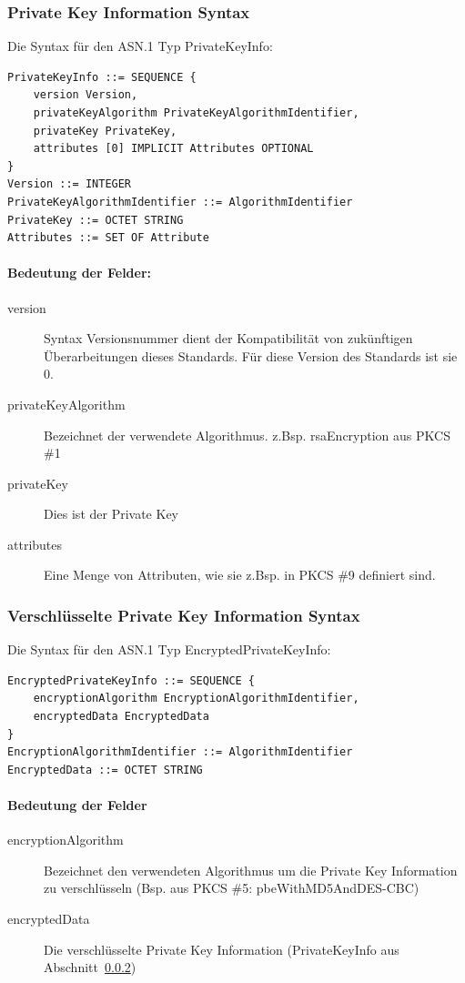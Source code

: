 \documentclass[10pt,a4paper]{article}
\begin{document}
\subsubsection{Private Key Information Syntax}
Die Syntax für den ASN.1 Typ PrivateKeyInfo:
\begin{verbatim}
PrivateKeyInfo ::= SEQUENCE {
    version Version,
    privateKeyAlgorithm PrivateKeyAlgorithmIdentifier,
    privateKey PrivateKey,
    attributes [0] IMPLICIT Attributes OPTIONAL
}
Version ::= INTEGER
PrivateKeyAlgorithmIdentifier ::= AlgorithmIdentifier
PrivateKey ::= OCTET STRING
Attributes ::= SET OF Attribute
\end{verbatim}

\paragraph{Bedeutung der Felder:}
\begin{description}
    \item[version] Syntax Versionsnummer dient der Kompatibilität von zukünftigen
        Überarbeitungen dieses Standards. Für diese Version des Standards ist sie 0.
    \item[privateKeyAlgorithm] Bezeichnet der verwendete Algorithmus. z.Bsp. rsaEncryption
        aus PKCS \#1
    \item[privateKey] Dies ist der Private Key
    \item[attributes] Eine Menge von Attributen, wie sie z.Bsp. in PKCS \#9 definiert
        sind.
\end{description}

\subsubsection{Verschlüsselte Private Key Information Syntax}
\label{sec:private-key-info}
Die Syntax für den ASN.1 Typ EncryptedPrivateKeyInfo:
\begin{verbatim}
EncryptedPrivateKeyInfo ::= SEQUENCE {
    encryptionAlgorithm EncryptionAlgorithmIdentifier,
    encryptedData EncryptedData
}
EncryptionAlgorithmIdentifier ::= AlgorithmIdentifier
EncryptedData ::= OCTET STRING
\end{verbatim}

\paragraph{Bedeutung der Felder}
\begin{description}
    \item[encryptionAlgorithm] Bezeichnet den verwendeten Algorithmus um die Private Key
        Information zu verschlüsseln (Bsp. aus PKCS \#5: pbeWithMD5AndDES-CBC)
    \item[encryptedData] Die verschlüsselte Private Key Information (PrivateKeyInfo aus
        Abschnitt~\ref{sec:private-key-info})
\end{description}
\end{document}
